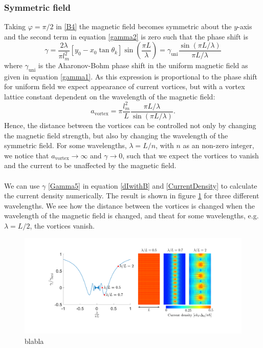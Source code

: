 \subsubsection{Symmetric field}
Taking $\varphi = \pi/2$ in \eqref{B4} the magnetic field becomes symmetric about the $y$-axis and the second term in equation \eqref{gamma2} is zero such that the phase shift is
\begin{equation}
\gamma= \frac{2\lambda}{\pi l_m^2}\left[y_0 - x_0\tan\theta_k\right]\sin\left(\frac{\pi L}{\lambda}\right) = \gamma_{\mathrm{uni}}\frac{\sin\left(\pi L/\lambda\right)}{\pi L/\lambda}
\label{Gamma5}
\end{equation}
where $\gamma_{\mathrm{uni}}$ is the Aharonov-Bohm phase shift in the uniform magnetic field as given in equation \eqref{gamma1}. As this expression is proportional to the phase shift for uniform field we expect appearance of current vortices, but with a vortex lattice constant dependent on the wavelength of the magnetic field: 
\begin{equation}
    a_{\mathrm{vortex}} = \pi\frac{l_m^2}{L}\frac{\pi L/\lambda}{\sin(\pi L/\lambda)}.
\end{equation}
Hence, the distance between the vortices can be controlled not only by changing the magnetic field strength, but also by changing the wavelength of the symmetric field. For some wavelengths, $\lambda = L/n$, with $n$ as an non-zero integer, we notice that $a_{\mathrm{vortex}} \rightarrow \infty$ and $\gamma \rightarrow 0$, such that we expect the vortices to vanish and the current to be unaffected by the magnetic field.
\\
\\
We can use $\gamma$ \eqref{Gamma5} in equation \eqref{dIwithB} and \eqref{CurrentDensity} to calculate the current density numerically. The result is shown in figure \ref{fig:Dist5} for three different wavelengths. We see how the distance between the vortices is changed when the wavelength of the magnetic field is changed, and theat for some wavelengths, e.g. $\lambda = L/2$, the vortices vanish. 
\begin{figure}[hhh]
\centering
\includegraphics[width=17cm,clip=true,trim=5cm 3cm 4.4cm 2cm]{fig/Dist5}
\caption{blabla}
\label{fig:Dist5}
\end{figure}

